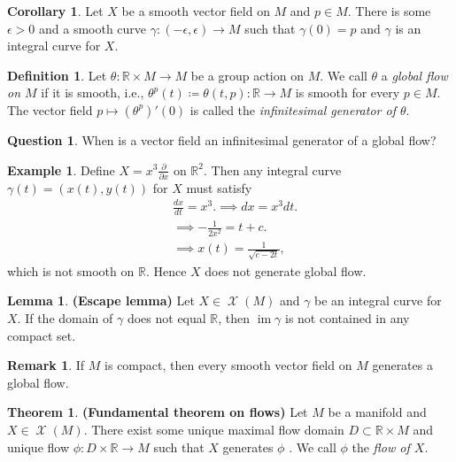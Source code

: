\documentclass[10pt,letterpaper,cm]{nupset}
\theoremstyle{definition}
\newtheorem*{definition}{Definition}
\newtheorem*{question}{Question}
\newtheorem{exmp}{Example}
\newtheorem{remark}{Remark}
\newtheorem{theorem}{Theorem}
\newtheorem{corollary}{Corollary}
\newtheorem{lemma}{Lemma}
\newcommand{\R}{\mathbb R}
\newcommand{\1}{\mathbf{1}}
\newcommand{\0}{\vec 0}
\DeclareMathOperator{\im}{im}
\DeclareMathOperator{\vf}{\mathscr{X}}
\begin{document}
\begin{corollary}
Let $X$ be a smooth vector field on $M$ and $p\in M$. There is some $\epsilon >0$ and a smooth curve $\gamma : (-\epsilon , \epsilon) \to M$ such that $\gamma(0)= p$ and $\gamma$ is an integral curve for $X$.
\end{corollary}

\begin{definition}
Let $\theta : \R \times M \to M$ be a group action on $M$. We call $\theta$ a \textit{global flow on $M$} if it is smooth, i.e., $\theta^p(t)\coloneqq  \theta(t, p) : \R \to M$ is smooth for every $p\in M$.
The vector field $p\mapsto  (\theta^p)'(0)$  is called the \textit{infinitesimal generator of $\theta$}.
\end{definition}

\begin{question}
When is a vector field an infinitesimal generator of  a global flow?
\end{question}

\begin{exmp}
Define $X = x^3\frac{\partial}{\partial{x}}$ on $\R^2$. Then any integral curve $\gamma (t) = (x(t), y(t))$ for $X$ must satisfy
\begin{align*}
& \frac{dx}{dt} = x^3.
 \implies  dx = x^3dt.
\\ & \implies -\frac{1}{2x^2} = t+c.
\\ & \implies x(t) = \frac{1}{\sqrt{c-2t}},
\end{align*}
which is not smooth on $\R$. Hence $X$ does not generate global flow.
\end{exmp}

\begin{lemma}{\textbf{(Escape lemma)}}
Let $X \in \vf(M)$ and $\gamma$ be an integral curve for $X$. If the domain of $\gamma$ does not equal $\R$, then $\im \gamma$ is not contained in any compact set.
\end{lemma}

\begin{remark}
If $M$ is compact, then every smooth vector field on $M$ generates a global flow.
\end{remark}

\begin{theorem}{\textbf{(Fundamental theorem on flows)}}
Let $M$ be a manifold and $X\in \vf(M)$. There exist some unique maximal flow domain $D\subset \R \times M$ and unique flow $\phi: D \times \R \to M$ such that $X$ generates $\phi$ . We call $\phi$ the \textit{flow of $X$}.
\end{theorem}
\end{document}
